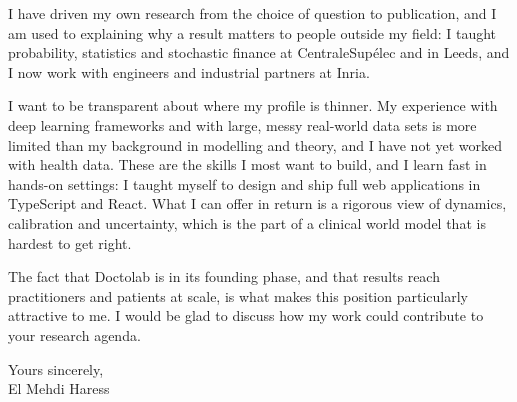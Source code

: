 \documentclass[11pt,a4paper]{article}
\begin{document}
I have driven my own research from the choice of question to publication, and I am used to explaining
why a result matters to people outside my field: I taught probability, statistics and stochastic finance
at CentraleSupélec and in Leeds, and I now work with engineers and industrial partners at Inria.

I want to be transparent about where my profile is thinner. My experience with deep learning frameworks
and with large, messy real-world data sets is more limited than my background in modelling and theory,
and I have not yet worked with health data. These are the skills I most want to build, and I learn
fast in hands-on settings: I taught myself to design and ship full web applications in TypeScript and
React. What I can offer in return is a rigorous view of dynamics, calibration and uncertainty, which is
the part of a clinical world model that is hardest to get right.

The fact that Doctolab is in its founding phase, and that results reach practitioners and patients at
scale, is what makes this position particularly attractive to me. I would be glad to discuss how my work
could contribute to your research agenda.

Yours sincerely,\\[0.8ex]
El Mehdi Haress
\end{document}
